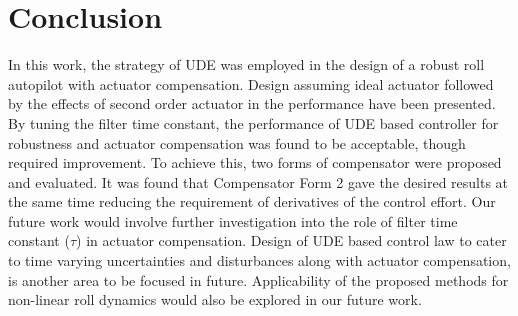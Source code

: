 \documentclass[conference]{IEEEtran}
\begin{document}
\section{Conclusion}
%
In this work, the strategy of UDE was employed in the design of a robust roll autopilot with actuator compensation. Design assuming ideal actuator followed by the effects of second order actuator in the performance have been presented. By tuning the filter time constant, the performance of UDE based controller for robustness and actuator compensation was found to be acceptable, though required improvement. To achieve this, two forms of compensator were proposed and evaluated. It was found that Compensator Form 2 gave the desired results at the same time reducing the requirement of derivatives of the control effort. Our future work would involve further investigation into the role of filter time constant ($\tau$) in actuator compensation. Design of UDE based control law to cater to time varying uncertainties and disturbances along with actuator compensation, is another area to be focused in future. Applicability of the proposed methods for non-linear roll dynamics would also be explored in our future work.
\end{document}
